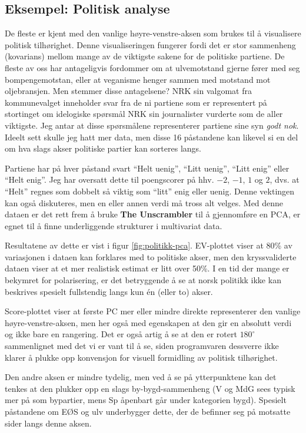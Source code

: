 \subsection{Eksempel: Politisk analyse}
De fleste er kjent med den vanlige høyre-venstre-aksen som brukes til å visualisere politisk tilhørighet. Denne visualiseringen fungerer fordi det er stor sammenheng (kovarians) mellom mange av de viktigste sakene for de politiske partiene. De fleste av oss har antageligvis fordommer om at ulvemotstand gjerne fører med seg bompengemotstan, eller at veganisme henger sammen med motstand mot oljebransjen. Men stemmer disse antagelsene? NRK sin valgomat fra kommunevalget inneholder svar fra de ni partiene som er representert på stortinget om idelogiske spørsmål NRK sin journalister vurderte som de aller viktigste. Jeg antar at disse spørsmålene representerer partiene sine syn \textit{godt nok}. Ideelt sett skulle jeg hatt mer data, men disse 16 påstandene kan likevel si en del om hva slags akser politiske partier kan sorteres langs.

Partiene har på hver påstand svart ``Helt uenig'', ``Litt uenig'', ``Litt enig'' eller ``Helt enig''. Jeg har oversatt dette til poengscorer på hhv. $-2$, $-1$, $1$ og $2$, dvs. at ``Helt'' regnes som dobbelt så viktig som ``litt'' enig eller uenig. Denne vektingen kan også diskuteres, men en eller annen verdi må tross alt velges. Med denne dataen er det rett frem å bruke \textbf{The Unscrambler\texttrademark} til å gjennomføre en PCA, er egnet til å finne underliggende strukturer i multivariat data.

Resultatene av dette er vist i figur \ref{fig:politikk-pca}. EV-plottet viser at 80\% av variasjonen i dataen kan forklares med to politiske akser, men den kryssvaliderte dataen viser at et mer realistisk estimat er litt over 50\%. I en tid der mange er bekymret for polarisering, er det betryggende å se at norsk politikk ikke kan beskrives spesielt fullstendig langs kun én (eller to) akser.

Score-plottet viser at første PC mer eller mindre direkte representerer den vanlige høyre-venstre-aksen, men her også med egenskapen at den gir en absolutt verdi og ikke bare en rangering. Det er også artig å se at den er rotert $180^\circ$ sammenlignet med det vi er vant til å se, siden programvaren dessverre ikke klarer å plukke opp konvensjon for visuell formidling av politisk tilhørighet.

Den andre aksen er mindre tydelig, men ved å se på ytterpunktene kan det tenkes at den plukker opp en slags by-bygd-sammenheng (V og MdG sees typisk mer på som bypartier, mens Sp åpenbart går under kategorien bygd). Spesielt påstandene om EØS og ulv underbygger dette, der de befinner seg på motsatte sider langs denne aksen.


